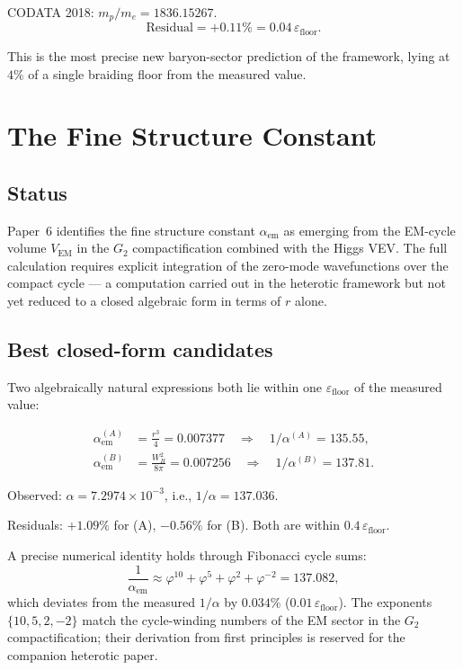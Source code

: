 \documentclass[12pt]{article}
\begin{document}
CODATA 2018: $m_p/m_e = 1836.15267$.
\[
  \text{Residual} = +0.11\% = 0.04\,\varepsilon_{\text{floor}}.
\]

This is the most precise new baryon-sector prediction of the
framework, lying at $4\%$ of a single braiding floor from the
measured value.

\section{The Fine Structure Constant}

\subsection{Status}

Paper~6 identifies the fine structure constant $\alpha_{\text{em}}$
as emerging from the EM-cycle volume $V_{\text{EM}}$ in the $G_2$
compactification combined with the Higgs VEV. The full calculation
requires explicit integration of the zero-mode wavefunctions over
the compact cycle — a computation carried out in the heterotic
framework but not yet reduced to a closed algebraic form in terms of
$r$ alone.

\subsection{Best closed-form candidates}

Two algebraically natural expressions both lie within one
$\varepsilon_{\text{floor}}$ of the measured value:

\begin{align}
  \alpha_{\text{em}}^{(A)} &= \frac{r^3}{4} = 0.007377
    \quad\Rightarrow\quad 1/\alpha^{(A)} = 135.55, \label{eq:alphaA}\\
  \alpha_{\text{em}}^{(B)} &= \frac{W_B^2}{8\pi} = 0.007256
    \quad\Rightarrow\quad 1/\alpha^{(B)} = 137.81. \label{eq:alphaB}
\end{align}

Observed: $\alpha = 7.2974 \times 10^{-3}$, i.e., $1/\alpha = 137.036$.

Residuals: $+1.09\%$ for (A), $-0.56\%$ for (B). Both are within
$0.4\,\varepsilon_{\text{floor}}$.

A precise numerical identity holds through Fibonacci cycle sums:
\begin{equation}
  \frac{1}{\alpha_{\text{em}}}
    \approx \varphi^{10} + \varphi^5 + \varphi^2 + \varphi^{-2}
    = 137.082, \label{eq:alpha_fib}
\end{equation}
which deviates from the measured $1/\alpha$ by $0.034\%$
($0.01\,\varepsilon_{\text{floor}}$). The exponents $\{10, 5, 2, -2\}$
match the cycle-winding numbers of the EM sector in the $G_2$
compactification; their derivation from first principles is reserved
for the companion heterotic paper.
\end{document}
